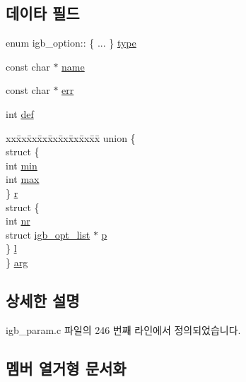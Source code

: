 \subsection*{데이타 필드}
\begin{DoxyCompactItemize}
\item 
enum igb\+\_\+option\+:: \{ ... \}  \hyperlink{structigb__option_aaf0786fec1a606c3c1a3d2c0ecbe0a63}{type}
\item 
const char $\ast$ \hyperlink{structigb__option_a8f8f80d37794cde9472343e4487ba3eb}{name}
\item 
const char $\ast$ \hyperlink{structigb__option_a2b204df2d3a2278921d9c7a4fc6a4d5b}{err}
\item 
int \hyperlink{structigb__option_a1d879277a80820e8232bceb4458507dc}{def}
\item 
\begin{tabbing}
xx\=xx\=xx\=xx\=xx\=xx\=xx\=xx\=xx\=\kill
union \{\\
\>struct \{\\
\>\>int \hyperlink{structigb__option_a3e202b201e6255d975cd6d3aff1f5a4d}{min}\\
\>\>int \hyperlink{structigb__option_ae1e1dde676c120fa6d10f3bb2c14059e}{max}\\
\>\} \hyperlink{structigb__option_a00d83a6cf59a5c65183583192896b975}{r}\\
\>struct \{\\
\>\>int \hyperlink{structigb__option_a2833bf188e6bf292fa7d61e2dd54d622}{nr}\\
\>\>struct \hyperlink{structigb__opt__list}{igb\_opt\_list} $\ast$ \hyperlink{structigb__option_aba77a6381efa5ce25704c47bdffd20cb}{p}\\
\>\} \hyperlink{structigb__option_a0a5dc97c2612260c60ca5cd724e47f2d}{l}\\
\} \hyperlink{structigb__option_a54a6c6fc46350c3bf91d43042c432672}{arg}\\

\end{tabbing}\end{DoxyCompactItemize}


\subsection{상세한 설명}


igb\+\_\+param.\+c 파일의 246 번째 라인에서 정의되었습니다.



\subsection{멤버 열거형 문서화}

